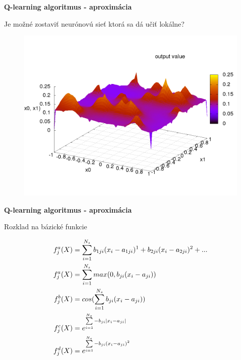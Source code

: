 \documentclass[xcolor=dvipsnames]{beamer}
\begin{document}
\begin{frame}{\bf Q-learning algoritmus - aproximácia}

Je možné zostaviť neurónovú sieť ktorá sa dá učiť lokálne?

\begin{figure}[!htb]
\includegraphics[scale=.35]{../pictures/gaussian.png}
\end{figure}

\end{frame}


\begin{frame}{\bf Q-learning algoritmus - aproximácia}

Rozklad na bázické funkcie

\begin{align}
    f_j^a(\boldmath{X}) &= \sum\limits_{i=1}^{N_s}{ b_{1ji}(x_i - a_{1ji})^1 + b_{2ji}(x_i - a_{2ji})^2 + ...  }  \\
    f_j^a(\boldmath{X}) &= \sum\limits_{i=1}^{N_s}{max(0, b_{ji}(x_i - a_{ji}))}  \\
    f_j^b(\boldmath{X}) &= cos(\sum\limits_{i=1}^{N_s}{b_{ji}(x_i - a_{ji}) })  \\
    f_j^c(\boldmath{X}) &= e^{ \sum\limits_{i=1}^{N_s}{-b_{ji}\mid x_i - a_{ji} \mid} }  \\
    f_j^d(\boldmath{X}) &= e^{ \sum\limits_{i=1}^{N_s}{-b_{ji}(x_i - a_{ji})^2} }
\end{align}

\end{frame}
\end{document}
